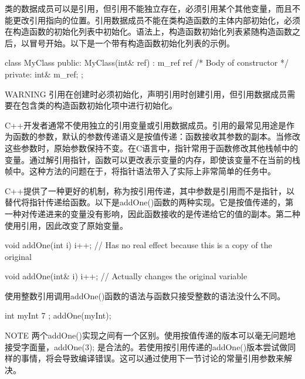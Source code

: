 
类的数据成员可以是引用，但引用不能独立存在，必须引用某个其他变量，而且不能更改引用指向的位置。引用数据成员不能在类构造函数的主体内部初始化，必须在构造函数的初始化列表中初始化。语法上，构造函数初始化列表紧随构造函数之后，以冒号开始。以下是一个带有构造函数初始化列表的示例。

\begin{cpp}
class MyClass
{
    public:
        MyClass(int& ref) : m_ref { ref } { /* Body of constructor */ }
    private:
        int& m_ref;
};
\end{cpp}

\begin{myWarning}{WARNING}
引用在创建时必须初始化，声明引用时创建引用，但引用数据成员需要在包含类的构造函数初始化项中进行初始化。
\end{myWarning}


C++开发者通常不使用独立的引用变量或引用数据成员。引用的最常见用途是作为函数的参数，默认的参数传递语义是按值传递：函数接收其参数的副本。当修改这些参数时，原始参数保持不变。在C语言中，指针常用于函数修改其他栈帧中的变量。通过解引用指针，函数可以更改表示变量的内存，即使该变量不在当前的栈帧中。这种方法的问题在于，将指针语法带入了实际上非常简单的任务中。

C++提供了一种更好的机制，称为按引用传递，其中参数是引用而不是指针，以替代将指针传递给函数。以下是addOne()函数的两种实现。它是按值传递的，第一种对传递进来的变量没有影响，因此函数接收的是传递给它的值的副本。第二种使用引用，因此改变了原始变量。

\begin{cpp}
void addOne(int i)
{
    i++; // Has no real effect because this is a copy of the original
}

void addOne(int& i)
{
    i++; // Actually changes the original variable
}
\end{cpp}

使用整数引用调用addOne()函数的语法与函数只接受整数的语法没什么不同。

\begin{cpp}
int myInt { 7 };
addOne(myInt);
\end{cpp}

\begin{myNotic}{NOTE}
两个addOne()实现之间有一个区别。使用按值传递的版本可以毫无问题地接受字面量，addOne(3); 是合法的。若使用按引用传递的addOne()版本尝试做同样的事情，将会导致编译错误。这可以通过使用下一节讨论的常量引用参数来解决。
\end{myNotic}


